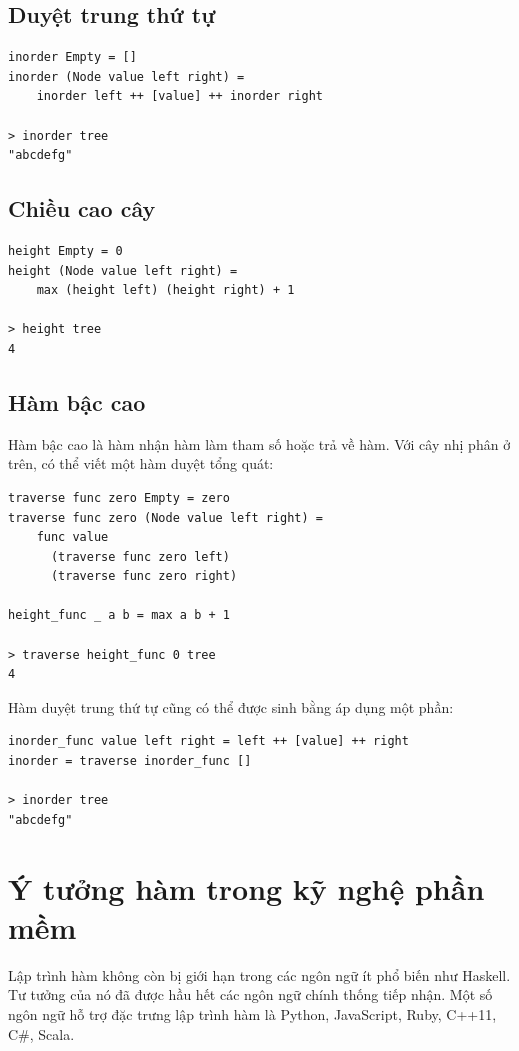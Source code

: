 \documentclass[11pt]{article}
\begin{document}
\subsection{Duyệt trung thứ tự}

\begin{verbatim}
inorder Empty = []
inorder (Node value left right) =
    inorder left ++ [value] ++ inorder right

> inorder tree
"abcdefg"
\end{verbatim}

\subsection{Chiều cao cây}

\begin{verbatim}
height Empty = 0
height (Node value left right) =
    max (height left) (height right) + 1

> height tree
4
\end{verbatim}

\subsection{Hàm bậc cao}

Hàm bậc cao là hàm nhận hàm làm tham số hoặc trả về hàm. Với cây nhị phân ở
trên, có thể viết một hàm duyệt tổng quát:
\begin{verbatim}
traverse func zero Empty = zero
traverse func zero (Node value left right) =
    func value
      (traverse func zero left)
      (traverse func zero right)

height_func _ a b = max a b + 1

> traverse height_func 0 tree
4
\end{verbatim}
Hàm duyệt trung thứ tự cũng có thể được sinh bằng áp dụng một phần:
\begin{verbatim}
inorder_func value left right = left ++ [value] ++ right
inorder = traverse inorder_func []

> inorder tree
"abcdefg"
\end{verbatim}

\section{Ý tưởng hàm trong kỹ nghệ phần mềm}

Lập trình hàm không còn bị giới hạn trong các ngôn ngữ ít phổ biến như
Haskell. Tư tưởng của nó đã được hầu hết các ngôn ngữ chính thống tiếp nhận.
Một số ngôn ngữ hỗ trợ đặc trưng lập trình hàm là Python, JavaScript, Ruby,
C++11, C\#, Scala.
\end{document}
